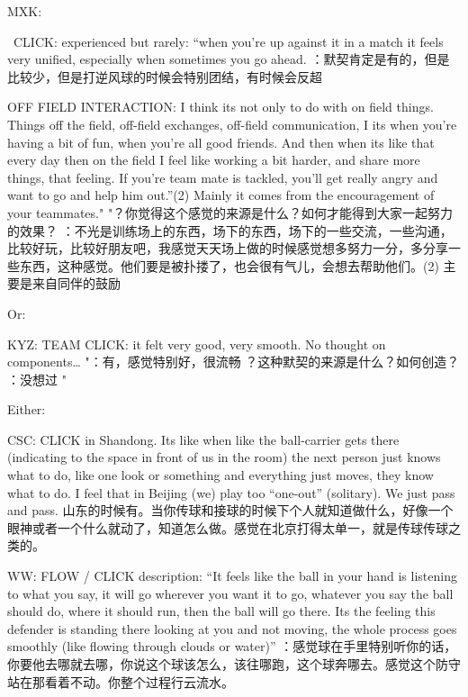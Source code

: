 \begin{CJK}{UTF8}{gbsn}
      MXK:

       CLICK: experienced but rarely:   “when you’re up against it in a match it feels very unified, especially when sometimes you go ahead.	：默契肯定是有的，但是比较少，但是打逆风球的时候会特别团结，有时候会反超

      OFF FIELD INTERACTION: I think its not only to do with on field things.  Things off the field, off-field exchanges, off-field communication, I its when you’re having a bit of fun, when you’re all good friends.  And then when its like that every day then on the field I feel like working a bit harder, and share more things, that feeling. If you’re team mate is tackled, you’ll get really angry and want to go and help him out.”(2) Mainly it comes from the encouragement of your teammates."	"？你觉得这个感觉的来源是什么？如何才能得到大家一起努力的效果？
      ：不光是训练场上的东西，场下的东西，场下的一些交流，一些沟通，比较好玩，比较好朋友吧，我感觉天天场上做的时候感觉想多努力一分，多分享一些东西，这种感觉。他们要是被扑搂了，也会很有气儿，会想去帮助他们。(2) 主要是来自同伴的鼓励 






  Or:

          KYZ:
          TEAM CLICK: it felt very good, very smooth.  No thought on components…	"：有，感觉特别好，很流畅
          ？这种默契的来源是什么？如何创造？
          ：没想过
          "


  Either:

          CSC:
          CLICK in Shandong. Its like when like the ball-carrier gets there (indicating to the space in front of us in the room) the next person just knows what to do, like one look or something and everything just moves, they know what to do. I feel that in Beijing (we) play too “one-out” (solitary). We just pass and pass.	山东的时候有。当你传球和接球的时候下个人就知道做什么，好像一个眼神或者一个什么就动了，知道怎么做。感觉在北京打得太单一，就是传球传球之类的。


           WW:
           FLOW / CLICK description: “It feels like the ball in your hand is listening to what you say, it will go wherever you want it to go, whatever you say the ball should do, where it should run, then the ball will go there.  Its the feeling this defender is standing there looking at you and not moving, the whole process goes smoothly (like flowing through clouds or water)”	：感觉球在手里特别听你的话，你要他去哪就去哪，你说这个球该怎么，该往哪跑，这个球奔哪去。感觉这个防守站在那看着不动。你整个过程行云流水。


\end{CJK}
